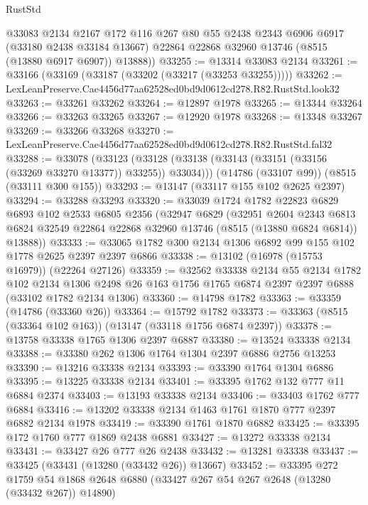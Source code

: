 \begin{lexlean}{RustStd}
\begin{coremodule}
        @33083
        @2134
        @2167
        @172
        @116
        @267
        @80
        @55
        @2438
        @2343
        @6906
        @6917
        (@33180 @2438 @33184 @13667)
        @22864
        @22868
        @32960
        @13746
        (@8515 (@13880 @6917 @6907))
        @13888))
@33255 := @13314 @33083 @2134
@33261 := @33166 (@33169 (@33187 (@33202 (@33217 (@33253 @33255)))))
@33262 := LexLeanPreserve.Cae4456d77aa62528ed0bd9d0612cd278.R82.RustStd.look32
@33263 := @33261 @33262
@33264 := @12897 @1978
@33265 := @13344 @33264
@33266 := @33263 @33265
@33267 := @12920 @1978
@33268 := @13348 @33267
@33269 := @33266 @33268
@33270 := LexLeanPreserve.Cae4456d77aa62528ed0bd9d0612cd278.R82.RustStd.fal32
@33288 := @33078
    (@33123 (@33128 (@33138 (@33143 (@33151 (@33156 (@33269 @33270 @13377)) @33255)) @33034)))
    (@14786 (@33107 @99))
    (@8515 (@33111 @300 @155))
@33293 := @13147 (@33117 @155 @102 @2625 @2397)
@33294 := @33288 @33293
@33320 := @33039
    @1724
    @1782
    @22823
    @6829
    @6893
    @102
    @2533
    @6805
    @2356
    (@32947
      @6829
      (@32951
        @2604
        @2343
        @6813
        @6824
        @32549
        @22864
        @22868
        @32960
        @13746
        (@8515 (@13880 @6824 @6814))
        @13888))
@33333 := @33065 @1782 @300 @2134 @1306 @6892 @99 @155 @102 @1778 @2625 @2397 @2397 @6866
@33338 := @13102 (@16978 (@15753 @16979)) (@22264 @27126)
@33359 := @32562
    @33338
    @2134
    @55
    @2134
    @1782
    @102
    @2134
    @1306
    @2498
    @26
    @163
    @1756
    @1765
    @6874
    @2397
    @2397
    @6888
    (@33102 @1782 @2134 @1306)
@33360 := @14798 @1782
@33363 := @33359 (@14786 (@33360 @26))
@33364 := @15792 @1782
@33373 := @33363 (@8515 (@33364 @102 @163)) (@13147 (@33118 @1756 @6874 @2397))
@33378 := @13758 @33338 @1765 @1306 @2397 @6887
@33380 := @13524 @33338 @2134
@33388 := @33380 @262 @1306 @1764 @1304 @2397 @6886 @2756 @13253
@33390 := @13216 @33338 @2134
@33393 := @33390 @1764 @1304 @6886
@33395 := @13225 @33338 @2134
@33401 := @33395 @1762 @132 @777 @11 @6884 @2374
@33403 := @13193 @33338 @2134
@33406 := @33403 @1762 @777 @6884
@33416 := @13202 @33338 @2134 @1463 @1761 @1870 @777 @2397 @6882 @2134 @1978
@33419 := @33390 @1761 @1870 @6882
@33425 := @33395 @172 @1760 @777 @1869 @2438 @6881
@33427 := @13272 @33338 @2134
@33431 := @33427 @26 @777 @26 @2438
@33432 := @13281 @33338
@33437 := @33425 (@33431 (@13280 (@33432 @26)) @13667)
@33452 := @33395
    @272
    @1759
    @54
    @1868
    @2648
    @6880
    (@33427 @267 @54 @267 @2648 (@13280 (@33432 @267)) @14890)

\end{coremodule}
\end{lexlean}
